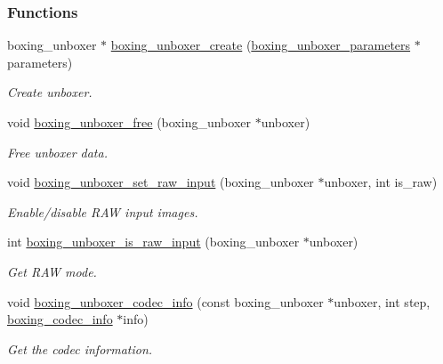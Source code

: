 \subsubsection*{Functions}
\begin{DoxyCompactItemize}
\item 
boxing\_\-unboxer $\ast$ \hyperlink{group__unboxer_gac2e6043a93bbf6541d50332dbf86b471}{boxing\_\-unboxer\_\-create} (\hyperlink{structboxing__unboxer__parameters__s}{boxing\_\-unboxer\_\-parameters} $\ast$parameters)
\begin{DoxyCompactList}\small\item\em Create unboxer. \item\end{DoxyCompactList}\item 
void \hyperlink{group__unboxer_ga754c1c3545803289577a78169af12ca0}{boxing\_\-unboxer\_\-free} (boxing\_\-unboxer $\ast$unboxer)
\begin{DoxyCompactList}\small\item\em Free unboxer data. \item\end{DoxyCompactList}\item 
void \hyperlink{group__unboxer_gaa35a6cc3bb000da1ae59f1d99fefe488}{boxing\_\-unboxer\_\-set\_\-raw\_\-input} (boxing\_\-unboxer $\ast$unboxer, int is\_\-raw)
\begin{DoxyCompactList}\small\item\em Enable/disable RAW input images. \item\end{DoxyCompactList}\item 
int \hyperlink{group__unboxer_ga7b80bcde9d5f997789229978003439c7}{boxing\_\-unboxer\_\-is\_\-raw\_\-input} (boxing\_\-unboxer $\ast$unboxer)
\begin{DoxyCompactList}\small\item\em Get RAW mode. \item\end{DoxyCompactList}\item 
void \hyperlink{group__unboxer_ga8ae669c445fbfae38b44931e2572f0ba}{boxing\_\-unboxer\_\-codec\_\-info} (const boxing\_\-unboxer $\ast$unboxer, int step, \hyperlink{structboxing__unboxing__codec__info__s}{boxing\_\-codec\_\-info} $\ast$info)
\begin{DoxyCompactList}\small\item\em Get the codec information. \item\end{DoxyCompactList}\item 

\end{DoxyCompactItemize}
